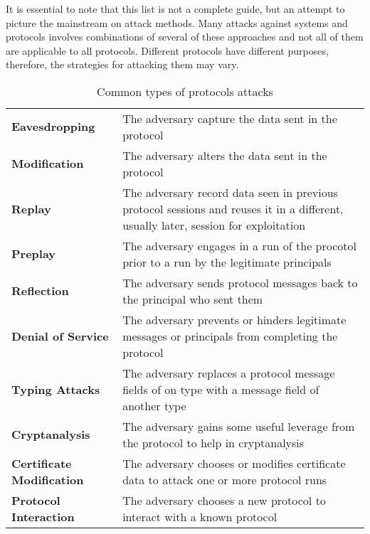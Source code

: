 It is essential to note that this list is not a complete guide, but an attempt to picture the mainstream on attack methods. Many attacks against systems and protocols involves combinations of several of these approaches and not all of them are applicable to all protocols. Different protocols have different purposes, therefore, the strategies for attacking them may vary.

\begin{table}\label{protocol-attacks}
  \caption{Common types of protocols attacks}

  {\def\arraystretch{1.5}
  \begin{tabular}[c]{l p{10cm}}
    \toprule
    \textbf{Eavesdropping} & The adversary capture the data sent in the protocol \\
    \textbf{Modification} & The adversary alters the data sent in the protocol \\
    \textbf{Replay} & The adversary record data seen in previous protocol sessions and reuses it in a different, usually later, session for exploitation \\
    \textbf{Preplay} & The adversary engages in a run of the procotol prior to a run by the legitimate principals \\
    \textbf{Reflection} & The adversary sends protocol messages back to the principal who sent them \\
    \textbf{Denial of Service} & The adversary prevents or hinders legitimate messages or principals from completing the protocol \\
    \textbf{Typing Attacks} & The adversary replaces a protocol message fields of on type with a message field of another type \\
    \textbf{Cryptanalysis} & The adversary gains some useful leverage from the protocol to help in cryptanalysis \\
    \textbf{Certificate Modification} & The adversary chooses or modifies certificate data to attack one or more protocol runs \\
    \textbf{Protocol Interaction} & The adversary chooses a new protocol to interact with a known protocol \\
    \bottomrule
  \end{tabular}
  }

\end{table}
